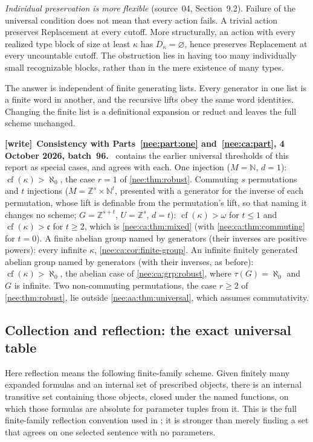 \documentclass[11pt,letterpaper]{article}
\numberwithin{equation}{section}
\theoremstyle{plain}
\theoremstyle{definition}
\theoremstyle{remark}
\newcommand{\cf}{\operatorname{cf}}
\newcommand{\cont}{\mathfrak c}
\newcommand{\NN}{\mathbb N}
\newcommand{\ZZ}{\mathbb Z}
\newenvironment{writenote}[1][]{\par\smallskip\begingroup\small\raggedright
 \setlength{\parindent}{1.25em}\noindent\textbf{[write]}\if\relax\detokenize{#1}\relax\else~\textbf{#1.}\fi\ }%
 {\par\endgroup\smallskip}
\begin{document}
\emph{Individual preservation is more flexible} (source~04, Section~9.2).
Failure of the universal condition does not mean that
every action fails. A trivial action preserves
Replacement at every cutoff.
More structurally, an action with every realized
type block of size at least $\kappa$ has
$D_\kappa=\varnothing$, hence preserves Replacement
at every uncountable cutoff. The obstruction lies
in having too many individually small recognizable
blocks, rather than in the mere existence of many
types.

The answer is independent of finite generating lists.
Every generator in one list is a finite word in another,
and the recursive lifts obey the same word identities.
Changing the finite list is a definitional expansion
or reduct and leaves the full scheme unchanged.

\begin{writenote}[Consistency with Parts~\ref{nee:part:one} and~\ref{nee:ca:part}, 4 October 2026, batch~96]
 contains the earlier universal thresholds of this report as special cases, and agrees with each. One injection ($M=\NN$, $d=1$): $\cf(\kappa)>\aleph_0$, the case $r=1$ of \cref{nee:thm:robust}. Commuting $s$ permutations and $t$ injections ($M=\ZZ^s\times\NN^t$, presented with a generator for the inverse of each permutation, whose lift is definable from the permutation's lift, so that naming it changes no scheme; $G=\ZZ^{s+t}$, $U=\ZZ^s$, $d=t$): $\cf(\kappa)>\omega$ for $t\leq1$ and $\cf(\kappa)>\cont$ for $t\geq2$, which is \cref{nee:ca:thm:mixed} (with \cref{nee:ca:thm:commuting} for $t=0$). A finite abelian group named by generators (their inverses are positive powers): every infinite $\kappa$, \cref{nee:ca:cor:finite-group}. An infinite finitely generated abelian group named by generators (with their inverses, as before): $\cf(\kappa)>\aleph_0$, the abelian case of \cref{nee:ca:grp:robust}, where $\tau(G)=\aleph_0$ and $G$ is infinite. Two non-commuting permutations, the case $r\geq2$ of \cref{nee:thm:robust}, lie outside \cref{nee:aa:thm:universal}, which assumes commutativity.
\end{writenote}

\subsection{Collection and reflection: the exact universal table}

Here reflection means the following finite-family scheme. Given finitely many
expanded formulas and an internal set of prescribed objects, there is an
internal transitive set containing those objects, closed under the named
functions, on which those formulas are absolute for parameter tuples from it.
This is the full finite-family reflection convention used in
\cite{RepoNamingIII}; it is stronger than merely finding a set that agrees on one
selected sentence with no parameters.
\end{document}
